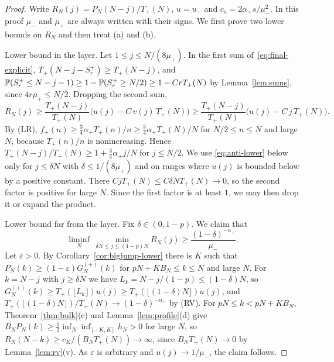 \begin{proof}
Write $R_N(j)=P_N(N-j)/T_\plus(N)$, $u=u_\minus$ and
$c_{\mathrm a}=2\alpha_\plus s/\mu_\minus^2$. In this proof $\mu_\minus$ and $\mu_\plus$ are
always written with their signs. We first prove two lower bounds on $R_N$ and then
treat (a) and (b).

Lower bound in the layer. Let $1\le j\le N/(8\mu_\plus)$. In the first sum
of~\eqref{eq:final-explicit}, $T_\plus(N-j-S^\plus_r)\ge T_\plus(N-j)$, and
$\mathbb{P}(S^{+}_r\le N-j-1)\ge1-\mathbb{P}(S^{+}_r\ge N/2)\ge1-CrT_{+}(N)$ by
Lemma~\ref{lem:sums}, since $4r\mu_\plus\le N/2$. Dropping the second sum,
\begin{equation}\label{eq:anti-lower}
 R_N(j)\ge\frac{T_\plus(N-j)}{T_\plus(N)}\bigl(u(j)-C\,v(j)\,T_\plus(N)\bigr)
 \ge\frac{T_\plus(N-j)}{T_\plus(N)}\bigl(u(j)-C\,j\,T_\plus(N)\bigr).
\end{equation}
By (LR), $f_\plus(n)\ge\frac34\alpha_\plus T_\plus(n)/n\ge\frac34\alpha_\plus T_\plus(N)/N$
for $N/2\le n\le N$ and large $N$, because $T_\plus(n)/n$ is nonincreasing. Hence
$T_\plus(N-j)/T_\plus(N)\ge1+\frac34\alpha_\plus j/N$ for $j\le N/2$. We use
\eqref{eq:anti-lower} below only for $j\le\delta N$ with $\delta\le1/(8\mu_\plus)$ and
on ranges where $u(j)$ is bounded below by a positive constant. There
$CjT_\plus(N)\le C\delta NT_\plus(N)\to0$, so the second factor is positive for large
$N$. Since the first factor is at least $1$, we may then drop it or expand the
product.

Lower bound far from the layer. Fix $\delta\in(0,1-p)$. We claim that
\begin{equation}\label{eq:anti-far}
 \liminf_N\ \min_{\delta N\le j\le(1-p)N}R_N(j)\ge\frac{(1-\delta)^{-\alpha_\plus}}{\mu_\minus}.
\end{equation}
Let $\varepsilon>0$. By Corollary~\ref{cor:bigjump-lower} there is $K$ such that
$P_N(k)\ge(1-\varepsilon)G^{(\plus)}_N(k)$ for $pN+KB_N\le k\le N$ and large $N$.
For $k=N-j$ with $j\ge\delta N$ we have $L_k=N-j/(1-p)\le(1-\delta)N$, so
$G^{(\plus)}_N(k)\ge T_\plus(\lfloor L_k\rfloor)u(j)\ge T_\plus(\lfloor(1-\delta)N\rfloor)u(j)$,
and $T_\plus(\lfloor(1-\delta)N\rfloor)/T_\plus(N)\to(1-\delta)^{-\alpha_\plus}$ by (RV).
For $pN\le k<pN+KB_N$, Theorem~\ref{thm:bulk}(c) and Lemma~\ref{lem:profile}(d)
give $B_NP_N(k)\ge\frac12\inf_N\inf_{[-K,K]}h_N>0$ for large $N$, so
$R_N(N-k)\ge c_K/(B_NT_\plus(N))\to\infty$, since $B_NT_\plus(N)\to0$ by
Lemma~\ref{lem:rv}(v). As $\varepsilon$ is arbitrary and $u(j)\to1/\mu_\minus$, the claim
follows.


\end{proof}

